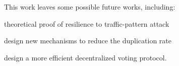 \documentclass[twocolumn]{article}
\begin{document}
This work leaves some possible future works, including:
\begin{enumerate*}[label=(\roman*)]
    \item theoretical proof of resilience to traffic-pattern attack
    \item design new mechanisms to reduce the duplication rate
    \item design a more efficient decentralized voting protocol.
\end{enumerate*}

{\footnotesize 

}
\end{document}
